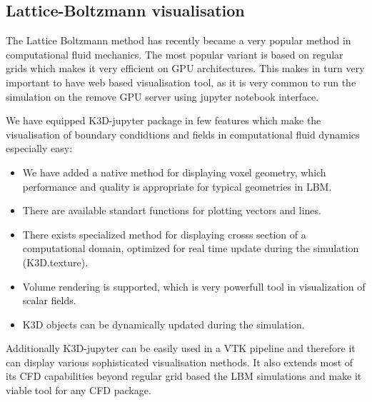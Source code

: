 \documentclass{deliverablereport}
\begin{document}
\subsection{Lattice-Boltzmann visualisation}

The Lattice Boltzmann method has recently became a very popular method
in computational fluid mechanics. The most popular variant is based on
regular grids which makes it very efficient on GPU architectures. This
makes in turn very important to have web based visualisation tool, as
it is very common to run the simulation on the remove GPU server using
jupyter notebook interface.

We have equipped K3D-jupyter package in few features which make the
visualisation of boundary condidtions and fields in computational
fluid dynamics especially easy:

\begin{itemize}
\item We have added a native method for displaying voxel geometry,
  which performance and quality is appropriate for typical geometries
  in LBM.
\item There are available standart functions for plotting vectors and lines.
\item There exists specialized method for displaying crosss section of
  a computational domain, optimized for real time update during the
  simulation (K3D.texture).
\item Volume rendering is supported, which is very powerfull tool in
  visualization of scalar fields.
\item K3D objects can be dynamically updated during the simulation.
\end{itemize}

Additionally K3D-jupyter can be easily used in a VTK pipeline and
therefore it can display various sophisticated visualisation
methods. It also extends most of its CFD capabilities beyond regular
grid based the LBM simulations and make it viable tool for any CFD
package.
\end{document}
